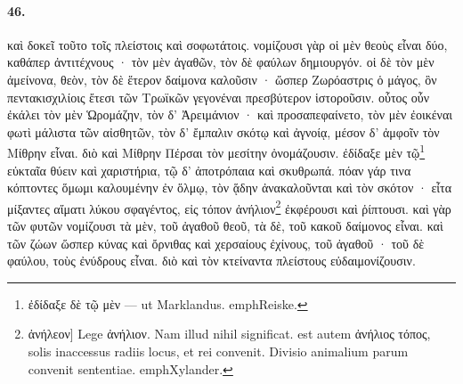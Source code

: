 \documentclass[a4paper, 11pt, oneside, polutonikogreek, german]{article}
\begin{document}
\paragraph{46.}
καὶ δοκεῖ τοῦτο τοῖς πλείστοις καὶ σοφωτάτοις. νομίζουσι γὰρ οἱ μὲν θεοὺς εἶναι δύο, καθάπερ ἀντιτέχνους · τὸν μὲν ἀγαθῶν, τὸν δὲ φαύλων δημιουργόν. οἱ δὲ τὸν μὲν ἀμείνονα, θεὸν, τὸν δὲ ἕτερον δαίμονα καλοῦσιν · ὥσπερ Ζωρόαστρις ὁ μάγος, ὃν πεντακισχιλίοις ἔτεσι τῶν Τρωϊκῶν γεγονέναι πρεσβύτερον ἱστοροῦσιν. οὗτος οὖν ἐκάλει τὸν μὲν Ὡρομάζην, τὸν δ' Ἀρειμάνιον · καὶ προσαπεφαίνετο, τὸν μὲν ἐοικέναι φωτὶ μάλιστα τῶν αἰσθητῶν, τὸν δ' ἔμπαλιν σκότῳ καὶ ἀγνοίᾳ, μέσον δ' ἀμφοῖν τὸν Μίθρην εἶναι. διὸ καὶ Μίθρην Πέρσαι τὸν μεσίτην ὀνομάζουσιν. ἐδίδαξε μὲν τῷ\footnote{ἐδίδαξε δὲ τῷ μὲν --- ut Marklandus. emph{Reiske.}} εὐκταῖα θύειν καὶ χαριστήρια, τῷ δ' ἀποτρόπαια καὶ σκυθρωπά. πόαν γάρ τινα κόπτοντες ὅμωμι καλουμένην ἐν ὅλμῳ, τὸν ᾅδην ἀνακαλοῦνται καὶ τὸν σκότον · εἶτα μίξαντες αἵματι λύκου σφαγέντος, εἰς τόπον ἀνήλιον\footnote{ἀνήλεον] Lege ἀνήλιον. Nam illud nihil significat. est autem ἀνήλιος τόπος, solis inaccessus radiis locus, et rei convenit. Divisio animalium parum convenit sententiae. emph{Xylander.}} ἐκφέρουσι καὶ ῥίπτουσι. καὶ γὰρ τῶν φυτῶν νομίζουσι τὰ μὲν, τοῦ ἀγαθοῦ θεοῦ, τὰ δὲ, τοῦ κακοῦ δαίμονος εἶναι. καὶ τῶν ζώων ὥσπερ κύνας καὶ ὄρνιθας καὶ χερσαίους ἐχίνους, τοῦ ἀγαθοῦ · τοῦ δὲ φαύλου, τοὺς ἐνύδρους εἶναι. διὸ καὶ τὸν κτείναντα πλείστους εὐδαιμονίζουσιν.
\end{document}
